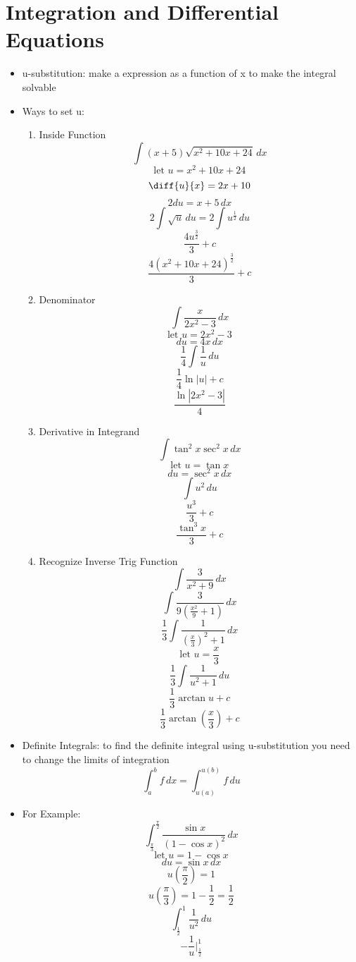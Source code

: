 \documentclass{article}
\newcommand{\letv}[1]{\text{let }#1 = }
\newcommand{\intbar}{\biggr\rvert}
\begin{document}
\section{Integration and Differential Equations}
\begin{itemize}
    \item u-substitution: make a expression as a function of x to make the integral solvable
    \item Ways to set u:
    \begin{enumerate}
        \item Inside Function
            \[\int(x+5)\sqrt{x^2+10x+24}\,dx\]
            \[\letv{u} x^2+10x+24\]
            \[\diff{u}{x} = 2x+10\]
            \[2du = x+5\,dx\]
            \[2\int\sqrt{u}\,du = 2\int u^{\frac{1}{2}}\,du\]
            \[\frac{4u^\frac{3}{2}}{3}+c\]
            \[\boxed{\frac{4(x^2+10x+24)^\frac{3}{2}}{3}+c}\]
        \item Denominator
            \[\int\frac{x}{2x^2-3}\,dx\]
            \[\letv{u} 2x^2-3\]
            \[du = 4x\,dx\]
            \[\frac{1}{4}\int\frac{1}{u}\,du\]
            \[\frac{1}{4}\ln|u|+c\]
            \[\boxed{\frac{\ln|2x^2-3|}{4}}\]
        \item Derivative in Integrand
            \[\int\tan^2x\sec^2x\,dx\]
            \[\letv{u} \tan x\]
            \[du = \sec^2x\,dx\]
            \[\int u^2\,du\]
            \[\frac{u^3}{3}+c\]
            \[\boxed{\frac{\tan^3x}{3}+c}\]
        \item Recognize Inverse Trig Function
            \[\int\frac{3}{x^2+9}\,dx\]
            \[\int\frac{3}{9(\frac{x^2}{9}+1)}\,dx\]
            \[\frac{1}{3}\int\frac{1}{(\frac{x}{3})^2+1}\,dx\]
            \[\letv{u} \frac{x}{3}\]
            \[\frac{1}{3}\int\frac{1}{u^2+1}\,du\]
            \[\frac{1}{3}\arctan u+c\]
            \[\boxed{\frac{1}{3}\arctan\left(\frac{x}{3}\right)+c}\]
    \end{enumerate}
    \item Definite Integrals: to find the definite integral using u-substitution you need to change the limits of integration
        \[\int_a^b f\,dx = \int_{u(a)}^{u(b)} f\,du\]
    \item For Example:
        \[\int_\frac{\pi}{3}^\frac{\pi}{2}\frac{\sin x}{(1-\cos x)^2}\,dx\]
        \[\letv{u}1-\cos x\]
        \[du = \sin x\,dx\]
        \[u\left(\frac{\pi}{2}\right) = 1\]
        \[u\left(\frac{\pi}{3}\right) = 1 - \frac{1}{2} = \frac{1}{2}\]
        \[\int_\frac{1}{2}^1\frac{1}{u^2}\,du\]
        \[-\frac{1}{u}\intbar_\frac{1}{2}^1\]

\end{itemize}
\end{document}
